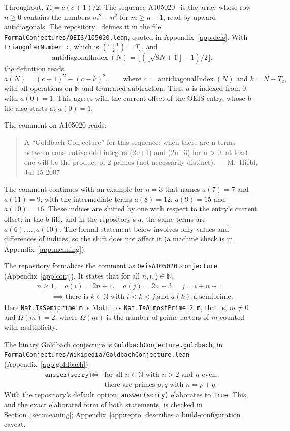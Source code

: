 \documentclass[11pt,a4paper]{article}
\newcommand{\li}{\lstinline[style=inline]}
\theoremstyle{plain}
\theoremstyle{remark}
\begin{document}
Throughout, $T_c = c(c+1)/2$. The sequence A105020~\cite{oeis-a105020} is the array
whose row $n \ge 0$ contains the numbers $m^2 - n^2$ for $m \ge n+1$, read by upward
antidiagonals. The repository~\cite{fc} defines it in the file
\nolinkurl{FormalConjectures/OEIS/105020.lean}, quoted in Appendix~\ref{app:defs}.
With \li{triangularNumber c}, which is $\binom{c+1}{2} = T_c$, and
\[
  \operatorname{antidiagonalIndex}(N)
    = \bigl\lfloor (\lfloor \sqrt{8N+1} \rfloor - 1)/2 \bigr\rfloor,
\]
the definition reads
\[
  a(N) = (c+1)^2 - (c-k)^2, \qquad \text{where } c = \operatorname{antidiagonalIndex}(N)
  \text{ and } k = N - T_c,
\]
with all operations on $\mathbb{N}$ and truncated subtraction. Thus $a$ is indexed
from $0$, with $a(0) = 1$. This agrees with the current offset of the OEIS entry, whose
b-file also starts at $a(0) = 1$.

The comment on A105020 reads:
\begin{quote}
A ``Goldbach Conjecture'' for this sequence: when there are n terms between
consecutive odd integers (2n+1) and (2n+3) for n > 0, at least one will be the product
of 2 primes (not necessarily distinct). --- M.~Hiebl, Jul 15 2007
\end{quote}
The comment continues with an example for $n = 3$ that names $a(7) = 7$ and
$a(11) = 9$, with the intermediate terms $a(8) = 12$, $a(9) = 15$ and $a(10) = 16$.
These indices are shifted by one with respect to the entry's current offset: in the
b-file, and in the repository's $a$, the same terms are $a(6), \dots, a(10)$. The
formal statement below involves only values and differences of indices, so the shift
does not affect it (a machine check is in Appendix~\ref{app:meaning}).

The repository formalizes the comment as \li{OeisA105020.conjecture}
(Appendix~\ref{app:conj}). It states that for all $n, i, j \in \mathbb{N}$,
\[
\begin{aligned}
  &n \ge 1,\quad a(i) = 2n+1,\quad a(j) = 2n+3,\quad j = i+n+1\\
  &\qquad \implies \text{there is } k \in \mathbb{N} \text{ with } i < k < j
    \text{ and } a(k) \text{ a semiprime.}
\end{aligned}
\]
Here \li{Nat.IsSemiprime m} is Mathlib's \li{Nat.IsAlmostPrime 2 m}, that is,
$m \neq 0$ and $\Omega(m) = 2$, where $\Omega(m)$ is the number of prime factors of $m$
counted with multiplicity.

The binary Goldbach conjecture is \li{GoldbachConjecture.goldbach}, in
\nolinkurl{FormalConjectures/Wikipedia/GoldbachConjecture.lean}
(Appendix~\ref{app:goldbach}):
\[
\begin{aligned}
  \texttt{answer(sorry)} \iff{}
    &\text{for all } n \in \mathbb{N} \text{ with } n > 2 \text{ and } n \text{ even},\\
    &\text{there are primes } p, q \text{ with } n = p + q.
\end{aligned}
\]
With the repository's default option, \li{answer(sorry)} elaborates to \li{True}. This,
and the exact elaborated form of both statements, is checked in
Section~\ref{sec:meaning}; Appendix~\ref{app:repro} describes a build-configuration
caveat.
\end{document}
